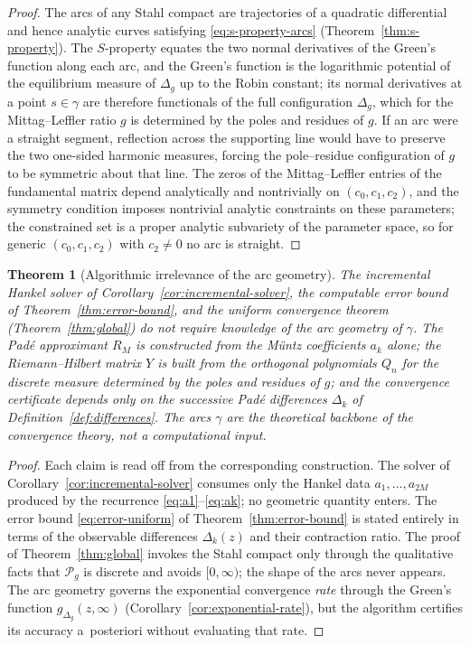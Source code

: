 \documentclass[11pt]{article}
\newtheorem{theorem}{Theorem}[section]
\theoremstyle{definition}
\theoremstyle{remark}
\begin{document}
\begin{proof}
The arcs of any Stahl compact are trajectories of a quadratic differential and hence analytic curves satisfying \eqref{eq:s-property-arcs} (Theorem~\ref{thm:s-property}). The $S$-property equates the two normal derivatives of the Green's function along each arc, and the Green's function is the logarithmic potential of the equilibrium measure of $\Delta_{g}$ up to the Robin constant; its normal derivatives at a point $s\in\gamma$ are therefore functionals of the full configuration $\Delta_{g}$, which for the Mittag--Leffler ratio $g$ is determined by the poles and residues of $g$. If an arc were a straight segment, reflection across the supporting line would have to preserve the two one-sided harmonic measures, forcing the pole--residue configuration of $g$ to be symmetric about that line. The zeros of the Mittag--Leffler entries of the fundamental matrix depend analytically and nontrivially on $(c_{0},c_{1},c_{2})$, and the symmetry condition imposes nontrivial analytic constraints on these parameters; the constrained set is a proper analytic subvariety of the parameter space, so for generic $(c_{0},c_{1},c_{2})$ with $c_{2}\ne 0$ no arc is straight.
\end{proof}

\begin{theorem}[Algorithmic irrelevance of the arc geometry]
\label{thm:arc-irrelevance}
The incremental Hankel solver of Corollary~\ref{cor:incremental-solver}, the computable error bound of Theorem~\ref{thm:error-bound}, and the uniform convergence theorem (Theorem~\ref{thm:global}) do not require knowledge of the arc geometry of $\gamma$. The Pad\'e approximant $R_{M}$ is constructed from the M\"untz coefficients $a_{k}$ alone; the Riemann--Hilbert matrix $Y$ is built from the orthogonal polynomials $Q_{n}$ for the discrete measure determined by the poles and residues of $g$; and the convergence certificate depends only on the successive Pad\'e differences $\Delta_{k}$ of Definition~\ref{def:differences}. The arcs $\gamma$ are the theoretical backbone of the convergence theory, not a computational input.
\end{theorem}

\begin{proof}
Each claim is read off from the corresponding construction. The solver of Corollary~\ref{cor:incremental-solver} consumes only the Hankel data $a_{1},\dots,a_{2M}$ produced by the recurrence \eqref{eq:a1}--\eqref{eq:ak}; no geometric quantity enters. The error bound \eqref{eq:error-uniform} of Theorem~\ref{thm:error-bound} is stated entirely in terms of the observable differences $\Delta_{k}(z)$ and their contraction ratio. The proof of Theorem~\ref{thm:global} invokes the Stahl compact only through the qualitative facts that $\mathcal{P}_{g}$ is discrete and avoids $[0,\infty)$; the shape of the arcs never appears. The arc geometry governs the exponential convergence \emph{rate} through the Green's function $g_{\Delta_{g}}(z,\infty)$ (Corollary~\ref{cor:exponential-rate}), but the algorithm certifies its accuracy a~posteriori without evaluating that rate.
\end{proof}
\end{document}
